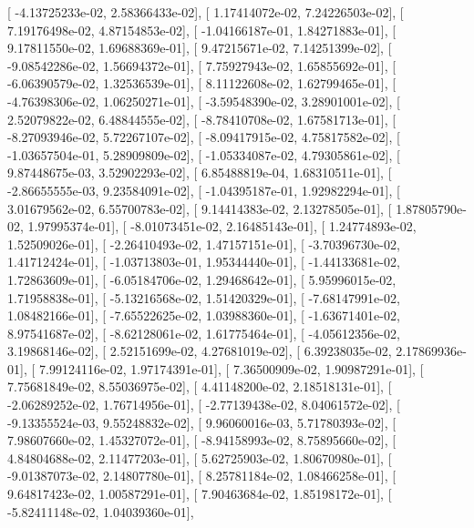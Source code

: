 \documentclass{article}
\begin{document}
       [ -4.13725233e-02,   2.58366433e-02],
       [  1.17414072e-02,   7.24226503e-02],
       [  7.19176498e-02,   4.87154853e-02],
       [ -1.04166187e-01,   1.84271883e-01],
       [  9.17811550e-02,   1.69688369e-01],
       [  9.47215671e-02,   7.14251399e-02],
       [ -9.08542286e-02,   1.56694372e-01],
       [  7.75927943e-02,   1.65855692e-01],
       [ -6.06390579e-02,   1.32536539e-01],
       [  8.11122608e-02,   1.62799465e-01],
       [ -4.76398306e-02,   1.06250271e-01],
       [ -3.59548390e-02,   3.28901001e-02],
       [  2.52079822e-02,   6.48844555e-02],
       [ -8.78410708e-02,   1.67581713e-01],
       [ -8.27093946e-02,   5.72267107e-02],
       [ -8.09417915e-02,   4.75817582e-02],
       [ -1.03657504e-01,   5.28909809e-02],
       [ -1.05334087e-02,   4.79305861e-02],
       [  9.87448675e-03,   3.52902293e-02],
       [  6.85488819e-04,   1.68310511e-01],
       [ -2.86655555e-03,   9.23584091e-02],
       [ -1.04395187e-01,   1.92982294e-01],
       [  3.01679562e-02,   6.55700783e-02],
       [  9.14414383e-02,   2.13278505e-01],
       [  1.87805790e-02,   1.97995374e-01],
       [ -8.01073451e-02,   2.16485143e-01],
       [  1.24774893e-02,   1.52509026e-01],
       [ -2.26410493e-02,   1.47157151e-01],
       [ -3.70396730e-02,   1.41712424e-01],
       [ -1.03713803e-01,   1.95344440e-01],
       [ -1.44133681e-02,   1.72863609e-01],
       [ -6.05184706e-02,   1.29468642e-01],
       [  5.95996015e-02,   1.71958838e-01],
       [ -5.13216568e-02,   1.51420329e-01],
       [ -7.68147991e-02,   1.08482166e-01],
       [ -7.65522625e-02,   1.03988360e-01],
       [ -1.63671401e-02,   8.97541687e-02],
       [ -8.62128061e-02,   1.61775464e-01],
       [ -4.05612356e-02,   3.19868146e-02],
       [  2.52151699e-02,   4.27681019e-02],
       [  6.39238035e-02,   2.17869936e-01],
       [  7.99124116e-02,   1.97174391e-01],
       [  7.36500909e-02,   1.90987291e-01],
       [  7.75681849e-02,   8.55036975e-02],
       [  4.41148200e-02,   2.18518131e-01],
       [ -2.06289252e-02,   1.76714956e-01],
       [ -2.77139438e-02,   8.04061572e-02],
       [ -9.13355524e-03,   9.55248832e-02],
       [  9.96060016e-03,   5.71780393e-02],
       [  7.98607660e-02,   1.45327072e-01],
       [ -8.94158993e-02,   8.75895660e-02],
       [  4.84804688e-02,   2.11477203e-01],
       [  5.62725903e-02,   1.80670980e-01],
       [ -9.01387073e-02,   2.14807780e-01],
       [  8.25781184e-02,   1.08466258e-01],
       [  9.64817423e-02,   1.00587291e-01],
       [  7.90463684e-02,   1.85198172e-01],
       [ -5.82411148e-02,   1.04039360e-01],
\end{document}
